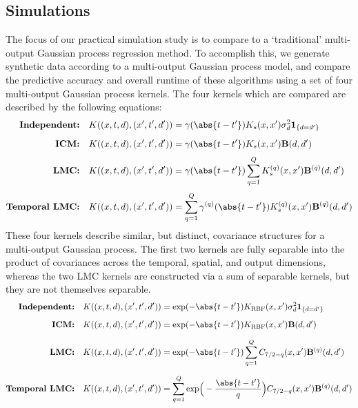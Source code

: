 \documentclass[10pt]{article}
\numberwithin{equation}{section}
\begin{document}
\subsection{Simulations}
The focus of our practical simulation study is to compare  to a `traditional' multi-output Gaussian process regression method. To accomplish this, we generate synthetic data according to a multi-output Gaussian process model, and compare the predictive accuracy and overall runtime of these algorithms using a set of four multi-output Gaussian process kernels. The four kernels which are compared are described by the following equations:
\begin{subequations}
    \label{eq:simulation-kernels}
    \begin{align}
        \textbf{Independent:} \quad K((x, t, d), (x', t', d')) &= \gamma(\abs{t - t'}) K_{s}(x, x') \sigma^{2}_{d}\mathbf{1}_{\{d = d'\}}\\[6pt]
        \textbf{ICM:} \quad K((x, t, d), (x', t', d')) &= \gamma(\abs{t - t'}) K_{s}(x, x') \bfB(d, d')\\[3pt]
        \textbf{LMC:} \quad K((x, t, d), (x', t', d')) &= \gamma(\abs{t - t'}) \sum_{q=1}^{Q} K_{s}^{(q)}(x, x') \bfB^{(q)}(d, d')\\[3pt]
        \textbf{Temporal LMC:} \quad K((x, t, d), (x', t', d')) &= \sum_{q=1}^{Q} \gamma^{(q)}(\abs{t - t'}) K_{s}^{(q)}(x, x') \bfB^{(q)}(d, d')
    \end{align}
\end{subequations}
These four kernels describe similar, but distinct, covariance structures for a multi-output Gaussian process. The first two kernels are fully separable into the product of covariances across the temporal, spatial, and output dimensions, whereas the two LMC kernels are constructed via a sum of separable kernels, but they are not themselves separable. 
\begin{subequations}
    \label{eq:simulation-kernel-eqns}
    \begin{align}
        \textbf{Independent:} \quad K((x, t, d), (x', t', d')) &= \exp(-\abs{t - t'})K_{\textrm{RBF}}(x, x')\sigma^{2}_{d}\mathbf{1}_{\{d = d'\}} \label{eq:simulation-indep-kernel}\\[6pt]
        \textbf{ICM:} \quad K((x, t, d), (x', t', d')) &= \exp(-\abs{t - t'})K_{\textrm{RBF}}(x, x')\bfB(d, d')\label{eq:simulation-icm-kernel}\\[6pt]
        \textbf{LMC:} \quad K((x, t, d), (x', t', d')) &= \exp(-\abs{t - t'})\sum_{q=1}^{Q}C_{7/2 - q}(x, x')\bfB^{(q)}(d, d')\label{eq:simulation-lmc-kernel}\\[6pt]
        \textbf{Temporal LMC:} \quad K((x, t, d), (x', t', d')) &= \sum_{q=1}^{Q}\exp\!\Big(-\frac{\abs{t - t'}}{q}\Big)C_{7/2 - q}(x, x')\bfB^{(q)}(d, d') \label{eq:simulation-lmc-temporal-kernel}
    \end{align}
\end{subequations}
\end{document}
